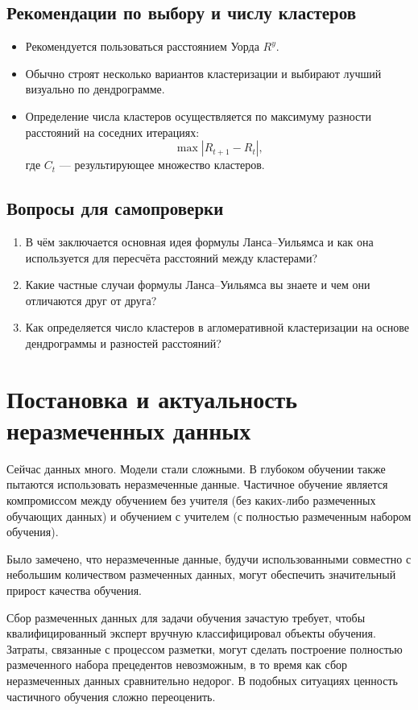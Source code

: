 \subsection{Рекомендации по выбору и числу кластеров}
\begin{itemize}
    \item Рекомендуется пользоваться расстоянием Уорда $R^{y}$.
    \item Обычно строят несколько вариантов кластеризации и выбирают лучший визуально по дендрограмме.
    \item Определение числа кластеров осуществляется по максимуму разности расстояний на соседних итерациях:
          \[
              \max |R_{t+1} - R_t|,
          \]
          где $C_t$ — результирующее множество кластеров.
\end{itemize}


\subsection*{Вопросы для самопроверки}
\begin{enumerate}
    \item В чём заключается основная идея формулы Ланса–Уильямса и как она используется для пересчёта расстояний между кластерами?
    \item Какие частные случаи формулы Ланса–Уильямса вы знаете и чем они отличаются друг от друга?
    \item Как определяется число кластеров в агломеративной кластеризации на основе дендрограммы и разностей расстояний?
\end{enumerate}

\section*{Постановка и актуальность неразмеченных данных}
Сейчас данных много. Модели стали сложными. В глубоком обучении также пытаются использовать неразмеченные данные. Частичное обучение является компромиссом между обучением без учителя (без каких-либо размеченных обучающих данных) и обучением с учителем (с полностью размеченным набором обучения). \par
Было замечено, что неразмеченные данные, будучи использованными совместно с небольшим количеством размеченных данных, могут обеспечить значительный прирост качества обучения. \par
Сбор размеченных данных для задачи обучения зачастую требует, чтобы квалифицированный эксперт вручную классифицировал объекты обучения. Затраты, связанные с процессом разметки, могут сделать построение полностью размеченного набора прецедентов невозможным, в то время как сбор неразмеченных данных сравнительно недорог. В подобных ситуациях ценность частичного обучения сложно переоценить.

